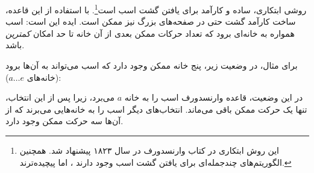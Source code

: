 
 روشی ابتکاری، ساده و کارآمد
برای یافتن گشت اسب است\footnote{این روش ابتکاری در
کتاب وارنسدورف \cite{war23} در سال ۱۸۲۳ پیشنهاد شد. همچنین الگوریتم‌های چندجمله‌ای
برای یافتن گشت اسب وجود دارند \cite{par97}، اما پیچیده‌ترند.}.
با استفاده از این قاعده، ساخت کارآمد گشت حتی
در صفحه‌های بزرگ نیز ممکن است.
ایده این است: اسب همواره به خانه‌ای برود
که تعداد حرکات ممکن بعدی از آن خانه تا حد امکان \emph{کمترین} باشد.

برای مثال، در وضعیت زیر، پنج خانه ممکن وجود دارد
که اسب می‌تواند به آن‌ها برود (خانه‌های $a \ldots e$):
\begin{center}
\end{center}
در این وضعیت، قاعده وارنسدورف اسب را به خانه $a$ می‌برد،
زیرا پس از این انتخاب، تنها یک حرکت ممکن باقی می‌ماند.
انتخاب‌های دیگر اسب را به خانه‌هایی می‌برند
که از آن‌ها سه حرکت ممکن وجود دارد.